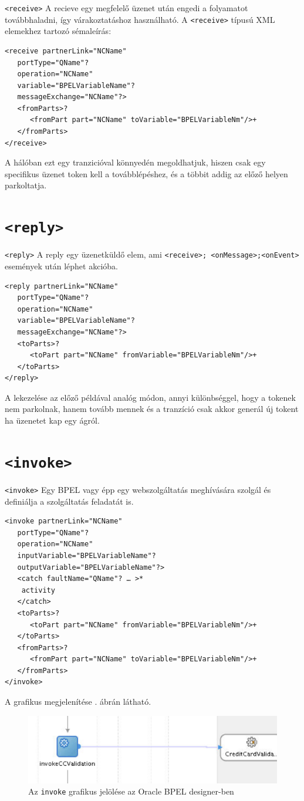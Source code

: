 \texttt{<receive>} A recieve egy megfelelő üzenet után engedi a folyamatot továbbhaladni, így várakoztatáshoz használható. A \texttt{<receive>} típusú XML elemekhez tartozó sémaleírás:\\
\begin{verbatim}
<receive partnerLink="NCName"
   portType="QName"?
   operation="NCName"
   variable="BPELVariableName"?
   messageExchange="NCName"?>
   <fromParts>?
      <fromPart part="NCName" toVariable="BPELVariableNm"/>+
   </fromParts>
</receive>
\end{verbatim}
A hálóban ezt egy tranzicióval könnyedén megoldhatjuk, hiszen csak egy specifikus üzenet token kell a továbblépéshez, és a többit addig az előző helyen parkoltatja. 

\section{\texttt{<reply>}}
\texttt{<reply>} A reply egy üzenetküldő elem, ami \texttt{<receive>; <onMessage>;<onEvent>} események után léphet akcióba. 
\begin{verbatim}
<reply partnerLink="NCName"
   portType="QName"?
   operation="NCName"
   variable="BPELVariableName"?
   messageExchange="NCName"?>
   <toParts>?
      <toPart part="NCName" fromVariable="BPELVariableNm"/>+
   </toParts>
</reply>
\end{verbatim}
A lekezelése az előző példával analóg módon, annyi különbséggel, hogy a tokenek nem parkolnak, hanem tovább mennek és a tranzíció csak akkor generál új tokent ha üzenetet kap egy ágról.

\section{\texttt{<invoke>}}
\texttt{<invoke>} Egy BPEL vagy épp egy webszolgáltatás meghívására szolgál és definiálja a szolgáltatás feladatát is. 
\begin{verbatim}
<invoke partnerLink="NCName"
   portType="QName"?
   operation="NCName"
   inputVariable="BPELVariableName"?
   outputVariable="BPELVariableName"?>
   <catch faultName="QName"? … >*
  	activity
   </catch>
   <toParts>?
      <toPart part="NCName" fromVariable="BPELVariableNm"/>+
   </toParts>
   <fromParts>?
      <fromPart part="NCName" toVariable="BPELVariableNm"/>+
   </fromParts>
</invoke>
\end{verbatim}
A grafikus megjelenítése . ábrán látható.

\begin{figure}[h!]
\centering
\includegraphics[scale=0.6]{images/invoke.png}
\caption{Az \texttt{invoke} grafikus jelölése az Oracle BPEL designer-ben}
\label{fig:invoke}
\end{figure}


